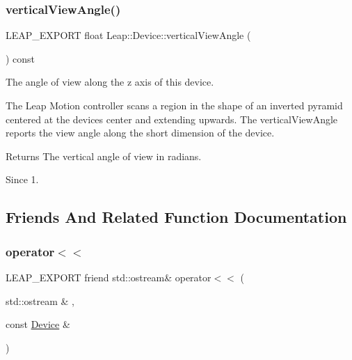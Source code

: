\subsubsection{\texorpdfstring{vertical\+View\+Angle()}{verticalViewAngle()}}
{\footnotesize\ttfamily L\+E\+A\+P\+\_\+\+E\+X\+P\+O\+RT float Leap\+::\+Device\+::vertical\+View\+Angle (\begin{DoxyParamCaption}{ }\end{DoxyParamCaption}) const}

The angle of view along the z axis of this device.



The Leap Motion controller scans a region in the shape of an inverted pyramid centered at the device\textquotesingle{}s center and extending upwards. The vertical\+View\+Angle reports the view angle along the short dimension of the device.


\begin{DoxyCodeInclude}
\end{DoxyCodeInclude}


\begin{DoxyReturn}{Returns}
The vertical angle of view in radians. 
\end{DoxyReturn}
\begin{DoxySince}{Since}
1. 
\end{DoxySince}


\subsection{Friends And Related Function Documentation}
\mbox{\label{class_leap_1_1_device_a5296f0c6d7b410e2ffc23c6e74a507ec}} 
\subsubsection{\texorpdfstring{operator$<$$<$}{operator<<}}
{\footnotesize\ttfamily L\+E\+A\+P\+\_\+\+E\+X\+P\+O\+RT friend std\+::ostream\& operator$<$$<$ (\begin{DoxyParamCaption}\item[{std\+::ostream \&}]{,  }\item[{const \hyperlink{class_leap_1_1_device}{Device} \&}]{ }\end{DoxyParamCaption})\hspace{0.3cm}{\ttfamily [friend]}}

